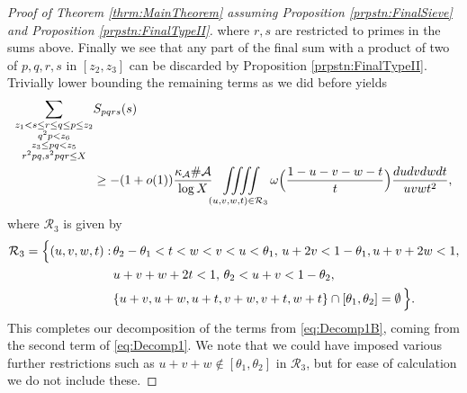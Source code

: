 \documentclass[10pt]{amsart}
\theoremstyle{plain}
\numberwithin{sblmm}{thrm}
\numberwithin{equation}{section}
\begin{document}
\begin{proof}[Proof of Theorem \ref{thrm:MainTheorem} assuming Proposition \ref{prpstn:FinalSieve} and Proposition \ref{prpstn:FinalTypeII}]
\endgroup
%
where $r,s$ are restricted to primes in the sums above. Finally we see that any part of the final sum with a product of two of $p,q,r,s$ in $[z_2,z_3]$ can be discarded by Proposition \ref{prpstn:FinalTypeII}. Trivially lower bounding the remaining terms as we did before yields
%
\begin{align}
\sum_{\substack{z_1<s\le r\le q\le p\le z_2\\ q^2 p < z_6\\ z_3\le p q<z_5\\ r^2p q, s^2p q r\le X }}&S_{p q r s}(s)\nonumber\\
&\ge-(1+o(1))\frac{\kappa_{\mathcal{A}}\#\mathcal{A}{}}{\log{X}}
 \iiiint\limits_{(u,v,w,t)\in\mathcal{R}_3}\omega\Bigl(\frac{1-u-v-w-t}{t}\Bigr)\frac{d u d v d w d t}{u v w t^2},
 \label{eq:I5}
\end{align}
%
where $\mathcal{R}_3$ is given by
%
\begin{align*}
\mathcal{R}_3
=\Bigl\{(u,v,w,t):\,
&\theta_2-\theta_1<t<w<v<u<\theta_1,\,u+2v<1-\theta_1,u+v+2w<1,\\
&u+v+w+2t<1,\,\theta_2<u+v<1-\theta_2,\\
 &\{u+v,u+w,u+t,v+w,v+t,w+t\}\cap[\theta_1,\theta_2]=\emptyset\,\Bigr\}.
\end{align*}
%
This completes our decomposition of the terms from \eqref{eq:Decomp1B}, coming from the second term of \eqref{eq:Decomp1}. We note that we could have imposed various further restrictions such as $u+v+w\notin[\theta_1,\theta_2]$ in $\mathcal{R}_3$, but for ease of calculation we do not include these.



\end{proof}
\end{document}
